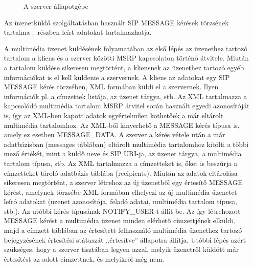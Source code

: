 \begin{figure}[htbp]
\center
{}
\caption{A szerver állapotgépe}
\label{fig:server_statemachine_message}
\end{figure}

Az üzenetküldő szolgáltatásban használt SIP MESSAGE kérések törzsének tartalma .~részben leírt adatokat tartalmazhatja.

A multimédia üzenet küldésének folyamatában az első lépés az üzenethez tartozó tartalom a kliens és a szerver közötti MSRP kapcsolaton történő átvitele. Miután a tartalom küldése sikeresen megtörtént, a kliensnek az üzenethez tartozó egyéb információkat is el kell küldenie a szervernek. A kliens az adatokat egy SIP MESSAGE kérés törzsében, XML formában küldi el a szervernek. Ilyen információk pl. a címzettek listája, az üzenet tárgya, stb. Az XML tartalmazza a kapcsolódó multimédia tartalom MSRP átvitel során használt egyedi azonosítóját is, így az XML-ben kapott adatok egyértelműen köthetőek a már eltárolt multimédia tartalomhoz.  Az XML-ből kinyerhető a MESSAGE kérés típusa is, amely ez esetben MESSAGE\_DATA. A szerver a kérés vétele után a már adatbázisban (messages táblában) eltárolt multimédia tartalomhoz kitölti a többi mező értékét, mint a küldő neve és SIP URI-ja, az üzenet tárgya, a multimédia tartalom típusa, stb. Az XML tartalmazza a címzetteket is, őket is beszúrja a címzetteket tároló adatbázis táblába (recipients). Miután az adatok eltárolása sikeresen megtörtént, a szerver létrehoz az új üzenetből egy értesítő MESSAGE kérést, amelynek törzsébe XML formában elhelyezi az új multimédia üzenetet leíró adatokat (üzenet azonosítója, feladó adatai, multimédia tartalom típusa, stb.). Az utóbbi kérés típusának NOTIFY\_USER-t állít be. Az így létrehozott MESSAGE kérést a multimédia üzenet minden elérhető címzettjének elküldi, majd a címzett táblában az értesített felhasználó multimédia üzenethez tartozó bejegyzésének értesítési státuszát ,,értesítve'' állapotra állítja. Utóbbi lépés azért szükséges, hogy a szerver tisztában legyen azzal, melyik üzenetről küldött már értesítést az adott címzettnek, és melyikről még nem.

